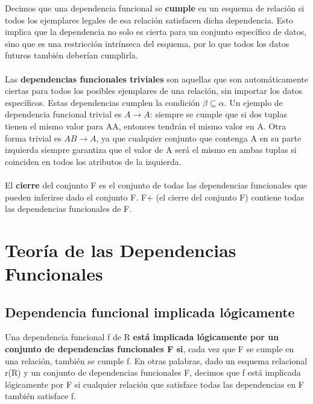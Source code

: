 \documentclass{article}
\begin{document}
Decimos que una dependencia funcional se \textbf{cumple} en un esquema de relación si todos los ejemplares legales de esa relación satisfacen dicha dependencia. Esto implica que la dependencia no solo es cierta para un conjunto específico de datos, sino que es una restricción intrínseca del esquema, por lo que todos los datos futuros también deberían cumplirla. \\

\\

Las \textbf{dependencias funcionales triviales} son aquellas que son automáticamente ciertas para todos los posibles ejemplares de una relación, sin importar los datos específicos. Estas dependencias cumplen la condición $\beta \subseteq \alpha$. Un ejemplo de dependencia funcional trivial es $A \xrightarrow{} A$: siempre se cumple que si dos tuplas tienen el mismo valor para AA, entonces tendrán el mismo valor en A. Otra forma trivial es $AB \xrightarrow{} A$, ya que cualquier conjunto que contenga A en su parte izquierda siempre garantiza que el valor de A será el mismo en ambas tuplas si coinciden en todos los atributos de la izquierda. \\

\\

El \textbf{cierre} del conjunto F es el conjunto de todas las dependencias funcionales que pueden inferirse dado el conjunto F. F+ (el cierre del conjunto F) contiene todas las dependencias funcionales de F.

\newpage

\section{Teoría de las Dependencias Funcionales}

\subsection{Dependencia funcional implicada lógicamente}
Una dependencia funcional f de R \textbf{está implicada lógicamente por un conjunto de dependencias funcionales F si}, cada vez que F se cumple en una relación, también se cumple f. En otras palabras, dado un esquema relacional r(R) y un conjunto de dependencias funcionales F, decimos que f está implicada lógicamente por F si cualquier relación que satisface todas las dependencias en F también satisface f. \\
\end{document}
